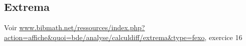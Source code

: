 \subsection{Extrema}


Voir \url{www.bibmath.net/ressources/index.php?action=affiche&quoi=bde/analyse/calculdiff/extrema&type=fexo}, exercice 16
